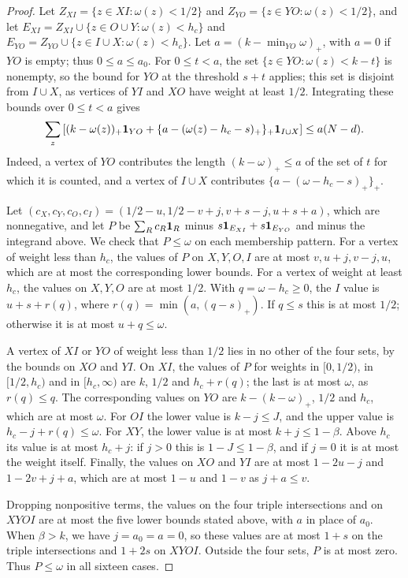 \begin{proof}
Let $Z_{XI}=\{z\in XI:\omega(z)<1/2\}$ and $Z_{YO}=\{z\in YO:\omega(z)<1/2\}$, and let
$E_{XI}=Z_{XI}\cup\{z\in O\cup Y:\omega(z)<h_c\}$ and
$E_{YO}=Z_{YO}\cup\{z\in I\cup X:\omega(z)<h_c\}$.
Let $a=(k-\min_{YO}\omega)_+$, with $a=0$ if $YO$ is empty;
thus $0\le a\le a_0$. For $0\le t<a$, the set
$\{z\in YO:\omega(z)<k-t\}$ is nonempty, so the bound for $YO$ at the threshold $s+t$ applies;
this set is disjoint from $I\cup X$, as vertices of $YI$ and $XO$ have weight at least $1/2$.
Integrating these bounds over $0\le t<a$ gives
\[
 \sum_z\left[(k-\omega(z))_+\mathbf 1_{YO}
       +\{a-(\omega(z)-h_c-s)_+\}_+\mathbf 1_{I\cup X}\right]
                         \le a(N-d).
\]
Indeed, a vertex
of $YO$ contributes the length $(k-\omega)_+\le a$ of the set of $t$ for which it is counted,
and a vertex of $I\cup X$ contributes $\{a-(\omega-h_c-s)_+\}_+$.

Let $(c_X,c_Y,c_O,c_I)=(1/2-u,1/2-v+j,v+s-j,u+s+a)$, which are nonnegative, and let $P$ be $\sum_Rc_R\mathbf 1_R$ minus $s\mathbf 1_{E_{XI}}+s\mathbf 1_{E_{YO}}$ and minus the integrand above. We check that $P\le\omega$ on each membership pattern.
For a vertex of weight less than $h_c$, the values of $P$ on $X,Y,O,I$ are at most $v,u+j,v-j,u$, which are at most
the corresponding lower bounds. For a vertex of weight at least $h_c$, the values on $X,Y,O$ are
at most $1/2$. With $q=\omega-h_c\ge0$, the $I$ value is
$u+s+r(q)$, where $r(q)=\min(a,(q-s)_+)$. If $q\le s$
this is at most $1/2$; otherwise it is at most $u+q\le\omega$.

A vertex of $XI$ or $YO$ of weight less than $1/2$ lies in no other of the four sets, by the bounds on $XO$ and $YI$.
On $XI$, the values of $P$ for weights in $[0,1/2)$, in $[1/2,h_c)$ and in $[h_c,\infty)$ are
$k$, $1/2$ and $h_c+r(q)$; the last is at most $\omega$, as $r(q)\le q$.
The corresponding values on $YO$ are
$k-(k-\omega)_+$, $1/2$ and $h_c$, which are at most $\omega$.
For $OI$ the lower value is $k-j\le J$, and the upper value
is $h_c-j+r(q)\le\omega$.
For $XY$, the lower value is at most $k+j\le1-\beta$.
Above $h_c$ its value is at most $h_c+j$: if $j>0$ this is
$1-J\le1-\beta$, and if $j=0$ it is at most the weight itself.
Finally, the values on $XO$ and $YI$ are at most
$1-2u-j$ and $1-2v+j+a$, which are at most $1-u$ and $1-v$ as $j+a\le v$.

Dropping nonpositive terms, the values on the four triple intersections and on
$XYOI$ are at most the five lower bounds stated above, with $a$ in place of $a_0$. When $\beta>k$, we have $j=a_0=a=0$, so these values are at most $1+s$ on the triple intersections and $1+2s$ on $XYOI$. Outside the four sets, $P$ is at most zero. Thus $P\le\omega$ in all sixteen cases.


\end{proof}

